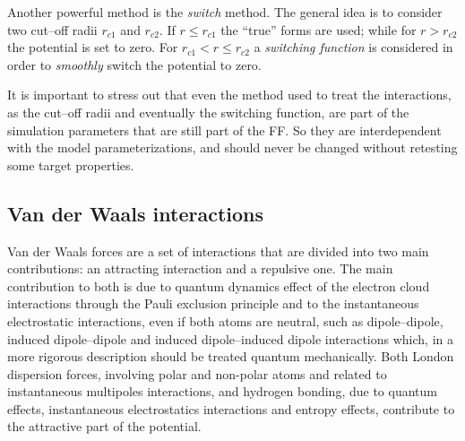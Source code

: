 Another powerful method is the \textit{switch} method. The general idea is to consider two cut--off radii  $r_{c1}$ and $r_{c2}$. If $r \le r_{c1}$ the ``true'' forms are used; while for $r > r_{c2}$ the potential is set to zero. For $r_{c1} < r \le r_{c2}$ a \textit{switching function} is considered in order to \textit{smoothly} switch the potential to zero.

It is important to stress out that even the method used to treat the interactions, as the cut--off radii and eventually the switching function, are part of the simulation parameters that are still part of the \ac{FF}. So they are interdependent with the model parameterizations, and should never be changed without retesting some target properties.


\subsection{Van der Waals interactions}
Van der Waals forces are a set of interactions that are divided into two main contributions: an attracting interaction and a repulsive one. The main contribution to both is due to quantum dynamics effect of the electron cloud interactions through the Pauli exclusion principle and to the instantaneous electrostatic interactions, even if both atoms are neutral, such as dipole--dipole, induced dipole--dipole and induced dipole--induced dipole interactions which, in a more rigorous description should be treated quantum mechanically. Both London dispersion forces, involving polar and non-polar atoms and related to instantaneous multipoles interactions, and hydrogen bonding, due to quantum effects, instantaneous electrostatics interactions and entropy effects, contribute to the attractive part of the potential. 

